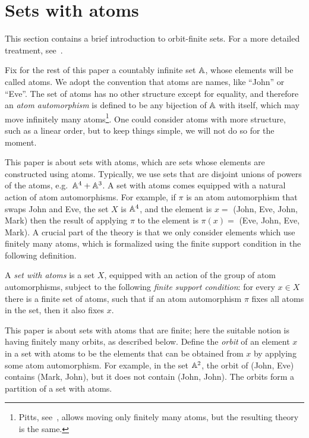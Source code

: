 \section{Sets with atoms}
This section contains a brief introduction to orbit-finite sets. For a more detailed treatment, see~\cite{bojanczyk_slightly2018}.

Fix for the rest of this paper a countably infinite set $\mathbb A$, whose elements will be called atoms. We adopt the convention that atoms are names, like  ``John'' or ``Eve''. The set of atoms has no other structure except for equality, and therefore an \emph{atom automorphism} is defined to be any bijection of $\mathbb A$ with itself, which may move infinitely many atoms\footnote{Pitts, see~\cite[Definition 1.13]{PittsAM:nomsns}, allows moving only finitely many atoms, but the resulting theory is the same.}. One could consider atoms with more structure, such as a linear order, but to keep things simple, we will not do so for the moment.

This paper is about sets with atoms, which are sets whose elements are constructed using atoms. Typically, we use sets that are disjoint unions of powers of the atoms, e.g.~$\mathbb A^4 + \mathbb A^3$. A set with atoms comes equipped with a natural action of atom automorphisms. For example, if $\pi$ is an atom automorphism that swaps John and Eve, the set $X$ is $\mathbb A^4$, and the element is  $x=$ (John, Eve, John, Mark) then the result of applying $\pi$ to the element is $\pi(x)=$ (Eve, John, Eve, Mark).  A crucial part of the theory is that we only consider elements which use finitely many atoms, which is formalized using the finite support condition in the following definition.

\begin{definition}
    A \emph{set with atoms} is a set $X$, equipped with an action of the group of atom automorphisms, subject to the following \emph{finite support condition}: for every $x \in X$ there is a finite set of atoms, such that if an atom automorphism $\pi$ fixes all atoms in the set, then it also fixes $x$.
\end{definition}
    
This paper is about sets with atoms that are finite; here the suitable notion is having finitely many orbits, as described below.
Define the \emph{orbit} of an element $x$ in a set with atoms to be the elements that can be obtained from $x$ by applying some atom automorphism. For example, in the set $\mathbb A^2$,  the orbit of (John, Eve)   contains  (Mark, John), but it does not contain (John, John). The orbits form a partition of a set with atoms. 


